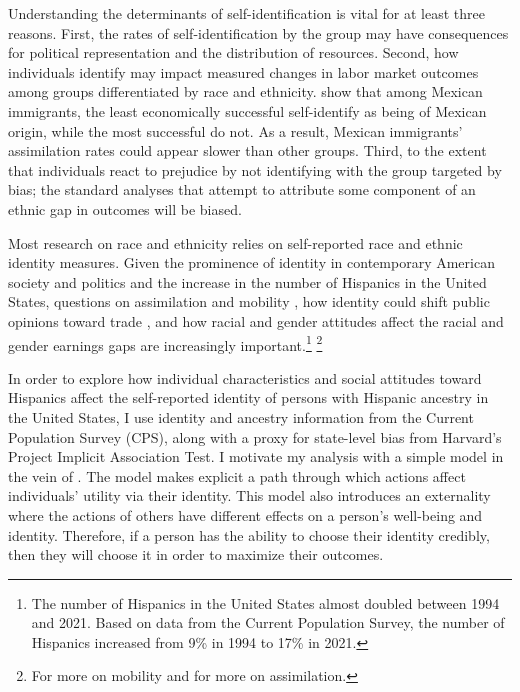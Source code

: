 \documentclass[12pt, fullpage]{article}
\begin{document}
Understanding the determinants of self-identification is vital for at least three reasons. First, the rates of self-identification by the group may have consequences for political representation and the distribution of resources. Second, how individuals identify may impact measured changes in labor market outcomes among groups differentiated by race and ethnicity.  \citet{antmanEthnicAttritionObserved2016} show that among Mexican immigrants, the least economically successful self-identify as being of Mexican origin, while the most successful do not. As a result, Mexican immigrants' assimilation rates could appear slower than other groups. Third, to the extent that individuals react to prejudice by not identifying with the group targeted by bias; the standard analyses that attempt to attribute some component of an ethnic gap in outcomes will be biased.

Most research on race and ethnicity relies on self-reported race and ethnic identity measures. Given the prominence of identity in contemporary American society and politics and the increase in the number of Hispanics in the United States, questions on assimilation and mobility \citep{chettyUnitedStatesStill2014,abramitzkyNationImmigrantsAssimilation2014}, how identity could shift public opinions toward trade \citep{grossmanIdentityPoliticsTrade2021}, and how racial and gender attitudes affect the racial and gender earnings gaps \citep{charlesPrejudiceWagesEmpirical2008,charlesEffectsSexismAmerican2018} are increasingly important.\footnote{The number of Hispanics in the United States almost doubled between 1994 and 2021. Based on data from the Current Population Survey, the number of Hispanics increased from 9\% in 1994 to 17\% in 2021.} \footnote{For more on mobility\citet{chettyEffectsExposureBetter2016,chettyFadingAmericanDream2017,chettyWhereLandOpportunity2014} and \citet{abramitzkyImmigrantsAssimilateMore2020a,abramitzkyCulturalAssimilationAge2016,chettyWhereLandOpportunity2014} for more on assimilation.}

In order to explore how individual characteristics and social attitudes toward Hispanics affect the self-reported identity of persons with Hispanic ancestry in the United States, I use identity and ancestry information from the Current Population Survey (CPS), along with a proxy for state-level bias from Harvard's Project Implicit Association Test. I motivate my analysis with a simple model in the vein of \citet{akerlofEconomicsIdentity2000}. The model makes explicit a path through which actions affect individuals' utility via their identity. This model also introduces an externality where the actions of others have different effects on a person's well-being and identity. Therefore, if a person has the ability to choose their identity credibly, then they will choose it in order to maximize their outcomes.
\end{document}
